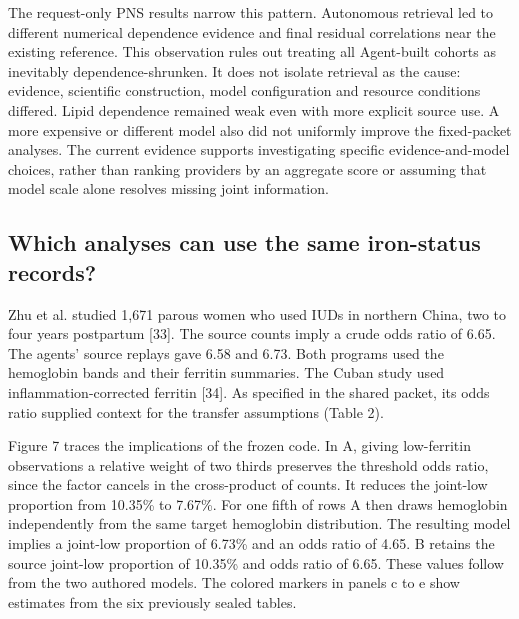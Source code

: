 \documentclass[11pt,letterpaper]{article}
\begin{document}
The request-only PNS results narrow this pattern. Autonomous retrieval led to different numerical dependence evidence and final residual correlations near the existing reference. This observation rules out treating all Agent-built cohorts as inevitably dependence-shrunken. It does not isolate retrieval as the cause: evidence, scientific construction, model configuration and resource conditions differed. Lipid dependence remained weak even with more explicit source use. A more expensive or different model also did not uniformly improve the fixed-packet analyses. The current evidence supports investigating specific evidence-and-model choices, rather than ranking providers by an aggregate score or assuming that model scale alone resolves missing joint information.


\subsection{Which analyses can use the same iron-status records?}

Zhu et al. studied 1,671 parous women who used IUDs in northern China, two to four years postpartum [33]. The source counts imply a crude odds ratio of 6.65. The agents' source replays gave 6.58 and 6.73. Both programs used the hemoglobin bands and their ferritin summaries. The Cuban study used inflammation-corrected ferritin [34]. As specified in the shared packet, its odds ratio supplied context for the transfer assumptions (Table 2).


Figure 7 traces the implications of the frozen code. In A, giving low-ferritin observations a relative weight of two thirds preserves the threshold odds ratio, since the factor cancels in the cross-product of counts. It reduces the joint-low proportion from 10.35\% to 7.67\%. For one fifth of rows A then draws hemoglobin independently from the same target hemoglobin distribution. The resulting model implies a joint-low proportion of 6.73\% and an odds ratio of 4.65. B retains the source joint-low proportion of 10.35\% and odds ratio of 6.65. These values follow from the two authored models. The colored markers in panels c to e show estimates from the six previously sealed tables.
\end{document}
